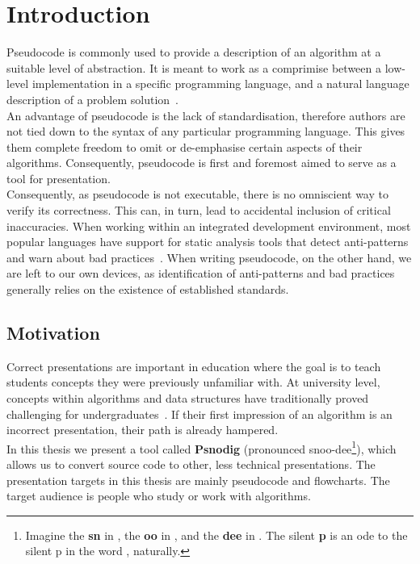 \chapter{Introduction}

Pseudocode is commonly used to provide a description of an algorithm at a suitable level of abstraction. It is meant to work as a comprimise between a low-level implementation in a specific programming language, and a natural language description of a problem solution~\cite{whatIsPseudocode}. \\

An advantage of pseudocode is the lack of standardisation, therefore authors are not tied down to the syntax of any particular programming language. This gives them complete freedom to omit or de-emphasise certain aspects of their algorithms. Consequently, pseudocode is first and foremost aimed to serve as a tool for presentation. \\

Consequently, as pseudocode is not executable, there is no omniscient way to verify its correctness. This can, in turn, lead to accidental inclusion of critical inaccuracies. When working within an integrated development environment, most popular languages have support for static analysis tools that detect anti-patterns and warn about bad practices~\cite{manyLinters, whatIsALinter}. 
When writing pseudocode, on the other hand, we are left to our own devices, as identification of anti-patterns and bad practices generally relies on the existence of established standards. \\

\section{Motivation}

Correct presentations are important in education where the goal is to teach students concepts they were previously unfamiliar with. At university level, concepts within algorithms and data structures have traditionally proved challenging for undergraduates~\cite{algorithmsAreHard1, algorithmsAreHard2, algorithmsAreHard3}. If their first impression of an algorithm is an incorrect presentation, their path is already hampered. \\

In this thesis we present a tool called \textbf{Psnodig} (pronounced snoo-dee\footnote{Imagine the \textbf{sn} in , the \textbf{oo} in , and the \textbf{dee} in . The silent \textbf{p} is an ode to the silent p in the word , naturally.}), which allows us to convert source code to other, less technical presentations. The presentation targets in this thesis are mainly pseudocode and flowcharts. The target audience is people who study or work with algorithms. \\

